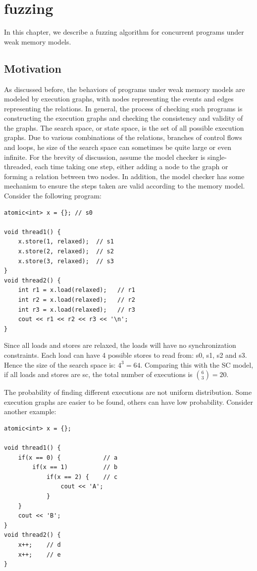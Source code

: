\chapter{\label{cha:title}fuzzing}

In this chapter, we describe a fuzzing algorithm for concurrent programs under weak memory models.

\section{Motivation}

As discussed before, the behaviors of programs under weak memory models are modeled by execution graphs, with nodes representing the events and edges representing the relations. In general, the process of checking such programs is constructing the execution graphs and checking the consistency and validity of the graphs. The search space, or state space, is the set of all possible execution graphs. Due to various combinations of the relations, branches of control flows and loops, he size of the search space can sometimes be quite large or even infinite. For the brevity of discussion, assume the model checker is single-threaded, each time taking one step, either adding a node to the graph or forming a relation between two nodes. In addition, the model checker has some mechanism to ensure the steps taken are valid according to the memory model. Consider the following program: 


\begin{lstlisting}[caption={P1}, label={P1}]
atomic<int> x = {}; // s0

void thread1() {
    x.store(1, relaxed);  // s1 
    x.store(2, relaxed);  // s2 
    x.store(3, relaxed);  // s3 
}
void thread2() {
    int r1 = x.load(relaxed);   // r1
    int r2 = x.load(relaxed);   // r2 
    int r3 = x.load(relaxed);   // r3 
    cout << r1 << r2 << r3 << '\n';
}
\end{lstlisting}

Since all loads and stores are relaxed, the loads will have no synchronization constraints. Each load can have 4 possible stores to read from: s0, s1, s2 and s3. Hence the size of the search space is: $4^3 = 64$. Comparing this with the SC model, if all loads and stores are sc, the total number of executions is $\binom{6}{3} = 20$. 

The probability of finding different executions are not uniform distribution. Some execution graphs are easier to be found, others can have low probability. Consider another example:
\begin{lstlisting}[caption={P2}, label={P2}]
atomic<int> x = {};

void thread1() {
    if(x == 0) {            // a
        if(x == 1)          // b
            if(x == 2) {    // c 
                cout << 'A';
            }
    }
    cout << 'B';
}
void thread2() {
    x++;    // d
    x++;    // e
}
\end{lstlisting}

